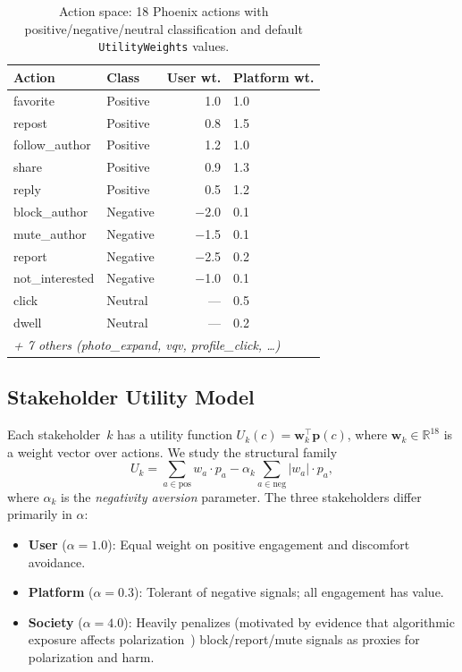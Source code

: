 \documentclass[11pt,letterpaper]{article}
\begin{document}
\begin{table}[t]
  \caption{Action space: 18 Phoenix actions with positive/negative/neutral
    classification and default \texttt{UtilityWeights} values.}
  \label{tab:actions}
  \centering\small
  \begin{tabular}{llrl}
    \toprule
    \textbf{Action} & \textbf{Class} & \textbf{User wt.} & \textbf{Platform wt.} \\
    \midrule
    favorite       & Positive  & 1.0  & 1.0 \\
    repost         & Positive  & 0.8  & 1.5 \\
    follow\_author & Positive  & 1.2  & 1.0 \\
    share          & Positive  & 0.9  & 1.3 \\
    reply          & Positive  & 0.5  & 1.2 \\
    \midrule
    block\_author  & Negative  & $-$2.0 & 0.1 \\
    mute\_author   & Negative  & $-$1.5 & 0.1 \\
    report         & Negative  & $-$2.5 & 0.2 \\
    not\_interested & Negative & $-$1.0 & 0.1 \\
    \midrule
    click          & Neutral   & ---  & 0.5 \\
    dwell          & Neutral   & ---  & 0.2 \\
    \multicolumn{4}{l}{\textit{+ 7 others (photo\_expand, vqv, profile\_click, \ldots)}} \\
    \bottomrule
  \end{tabular}
\end{table}

\subsection{Stakeholder Utility Model}

Each stakeholder~$k$ has a utility function
$U_k(c) = \mathbf{w}_k^\top \mathbf{p}(c)$, where
$\mathbf{w}_k \in \mathbb{R}^{18}$ is a weight vector over actions.
We study the structural family
\begin{equation}
  U_k = \sum_{a \in \text{pos}} w_a \cdot p_a
      - \alpha_k \sum_{a \in \text{neg}} |w_a| \cdot p_a,
  \label{eq:utility}
\end{equation}
where $\alpha_k$ is the \emph{negativity aversion} parameter. The
three stakeholders differ primarily in $\alpha$:

\begin{itemize}
  \item \textbf{User} ($\alpha = 1.0$): Equal weight on positive
    engagement and discomfort avoidance.
  \item \textbf{Platform} ($\alpha = 0.3$): Tolerant of negative
    signals; all engagement has value.
  \item \textbf{Society} ($\alpha = 4.0$): Heavily penalizes (motivated by evidence that algorithmic exposure affects polarization~\cite{bail2018exposure})
    block/report/mute signals as proxies for polarization and harm.
\end{itemize}
\end{document}
